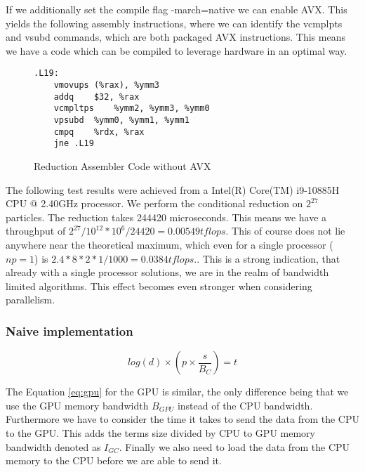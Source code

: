 \documentclass[]{article}
\begin{document}
If we additionally set the compile flag -march=native we can enable AVX. This yields the following assembly instructions, where we can identify the vcmplpts and vsubd commands, which are both packaged AVX instructions. This means we have a code which can be compiled to leverage hardware in an optimal way.

\begin{figure}
\begin{lstlisting}
.L19:
	vmovups	(%rax), %ymm3
	addq	$32, %rax
	vcmpltps	%ymm2, %ymm3, %ymm0
	vpsubd	%ymm0, %ymm1, %ymm1
	cmpq	%rdx, %rax
	jne	.L19	

\end{lstlisting}
\caption{Reduction Assembler Code without AVX}
\label{fig:assembler-avx}
\end{figure}

The following test results were achieved from a Intel(R) Core(TM) i9-10885H CPU @ 2.40GHz
processor. We perform the conditional reduction on  $2^{27}$ particles. The reduction takes 244420 microseconds. This means we have a throughput of $2^{27} / 10^{12} * 10^6 / 24420 = 0.00549 tflops$. This of course does not lie anywhere near the theoretical maximum, which even for a single processor ($np = 1$) is $2.4 * 8 * 2 * 1 / 1000 = 0.0384 tflops.$. This is a strong indication, that already with a single processor solutions, we are in the realm of bandwidth limited algorithms. This effect becomes even stronger when considering parallelism. 



\subsubsection{Naive implementation}

\begin{center}
	\begin{equation}
			log(d) \times \left ( p \times \frac{ s }{B_{C}} \right ) = t
			\label{eq:cpu}
	\end{equation}
\end{center}

\vspace{5mm}


The Equation \ref{eq:gpu} for the GPU is similar, the only difference being that we use the GPU memory bandwidth $B_{GPU}$ instead of the CPU bandwidth. Furthermore we have to consider the time it takes to send the data from the CPU to the GPU. This adds the terms size divided by CPU to GPU memory bandwidth denoted as $I_{GC}$. Finally we also need to load the data from the CPU memory to the CPU before we are able to send it. 
\end{document}
